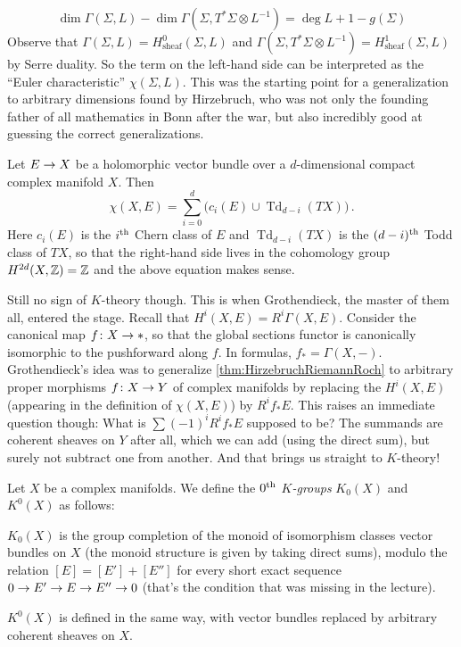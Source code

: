 	\begin{equation*}
		\dim\Gamma(\Sigma,L)-\dim \Gamma\left(\Sigma,T^*\Sigma\otimes L^{-1}\right)=\deg L+1-g(\Sigma)
	\end{equation*}
	Observe that $\Gamma(\Sigma,L)=H_\mathrm{sheaf}^0(\Sigma,L)$ and $\Gamma(\Sigma,T^*\Sigma\otimes L^{-1})=H_\mathrm{sheaf}^1(\Sigma,L)$ by Serre duality. So the term on the left-hand side can be interpreted as the \enquote{Euler characteristic} $\chi(\Sigma,L)$. This was the starting point for a generalization to arbitrary dimensions found by Hirzebruch, who was not only the founding father of all mathematics in Bonn after the war, but also incredibly good at guessing the correct generalizations.
	\begin{thm}\label{thm:HirzebruchRiemannRoch}
		Let $E\morphism X$ be a holomorphic vector bundle over a $d$-dimensional compact complex manifold $X$. Then
		\begin{equation*}
			\chi(X,E)=\sum_{i=0}^d\big(c_i(E)\cup \operatorname{Td}_{d-i}(TX)\big)\,.
		\end{equation*}
		Here $c_i(E)$ is the $i^{\text{th}}$ Chern class of $E$ and $\operatorname{Td}_{d-i}(TX)$ is the $(d-i)^{\text{th}}$ Todd class of $TX$, so that the right-hand side lives in the cohomology group $H^{2d}(X,\mathbb{Z})=\mathbb{Z}$ and the above equation makes sense.
	\end{thm}
	Still no sign of $K$-theory though. This is when Grothendieck, the master of them all, entered the stage. 
	Recall that $H^i(X,E)=R^i\Gamma(X,E)$. Consider the canonical map $f\colon X\morphism *$, so that the global sections functor is canonically isomorphic to the pushforward along $f$. In formulas,  $f_*=\Gamma(X,-)$. Grothendieck's idea was to generalize \cref{thm:HirzebruchRiemannRoch} to arbitrary proper morphisms $f\colon X\morphism Y$ of complex manifolds by replacing the $H^i(X,E)$ (appearing in the definition of $\chi(X,E)$) by $R^if_*E$. This raises an immediate question though: What is $\sum(-1)^iR^if_*E$ supposed to be? The summands are coherent sheaves on $Y$ after all, which we can add (using the direct sum), but surely not subtract one from another. And that brings us straight to $K$-theory!
	\begin{defi}\label{def:K0X}
		Let $X$ be a complex manifolds. We define the \emph{$0^{\text{th}}$ $K$-groups} $K_0(X)$ and $K^0(X)$ as follows:
		\begin{alphanumerate}
			\item $K_0(X)$ is the group completion of the monoid of isomorphism classes vector bundles on $X$ (the monoid structure is given by taking direct sums), modulo the relation $[E]=[E']+[E'']$ for every short exact sequence $0\morphism E'\morphism E\morphism E''\morphism 0$ (that's the condition that was missing in the lecture).
			\item $K^0(X)$ is defined in the same way, with vector bundles replaced by arbitrary coherent sheaves on $X$.
		\end{alphanumerate}
	\end{defi}
